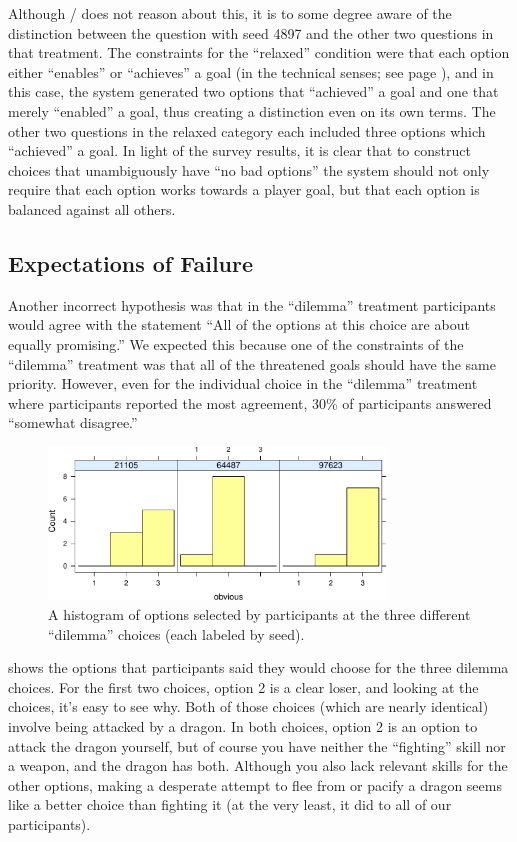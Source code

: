Although \dunyazad/ does not reason about this, it is to some degree aware of the distinction between the question with seed 4897 and the other two questions in that treatment.
%
The constraints for the ``relaxed'' condition were that each option either ``enables'' or ``achieves'' a goal (in the technical senses; see page \pageref{page:choicetypes}), and in this case, the system generated two options that ``achieved'' a goal and one that merely ``enabled'' a goal, thus creating a distinction even on its own terms.
%
The other two questions in the relaxed category each included three options which ``achieved'' a goal.
%
In light of the survey results, it is clear that to construct choices that unambiguously have ``no bad options'' the system should not only require that each option works towards a player goal, but that each option is balanced against all others.


\subsection{Expectations of Failure}

Another incorrect hypothesis was that in the ``dilemma'' treatment participants would agree with the statement ``All of the options at this choice are about equally promising.''
%
We expected this because one of the constraints of the ``dilemma'' treatment was that all of the threatened goals should have the same priority.
%
However, even for the individual choice in the ``dilemma'' treatment where participants reported the most agreement, 30\% of participants answered ``somewhat disagree.'' 


\begin{figure}[!h]
  \centering
  \includegraphics[width=0.8\textwidth,page=3]{fig/choices-cropped.pdf}
  \caption{A histogram of options selected by participants at the three different ``dilemma'' choices (each labeled by seed).}
  \label{fig:dilchoices}
\end{figure}


 shows the options that participants said they would choose for the three dilemma choices.
%
For the first two choices, option 2 is a clear loser, and looking at the choices, it's easy to see why.
%
Both of those choices (which are nearly identical) involve being attacked by a dragon.
%
In both choices, option 2 is an option to attack the dragon yourself, but of course you have neither the ``fighting'' skill nor a weapon, and the dragon has both.
%
Although you also lack relevant skills for the other options, making a desperate attempt to flee from or pacify a dragon seems like a better choice than fighting it (at the very least, it did to all of our participants).


